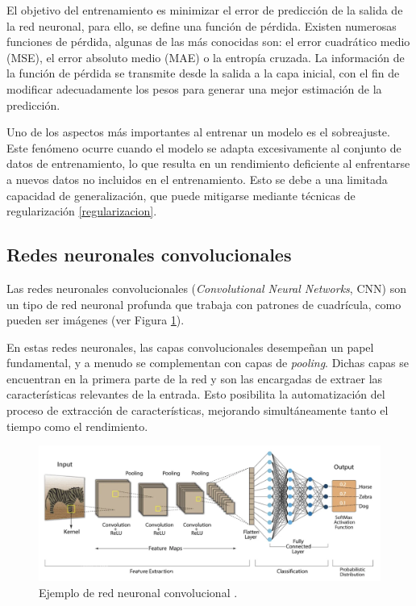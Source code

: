 El objetivo del entrenamiento es minimizar el error de predicción de la salida de la red neuronal, para ello, se define una función de pérdida. Existen numerosas funciones de pérdida, algunas de las más conocidas son: el error cuadrático medio (MSE), el error absoluto medio (MAE) o la entropía cruzada. La información de la función de pérdida se transmite desde la salida a la capa inicial, con el fin de modificar adecuadamente los pesos para generar una mejor estimación de la predicción.

Uno de los aspectos más importantes al entrenar un modelo es el sobreajuste. Este fenómeno ocurre cuando el modelo se adapta excesivamente al conjunto de datos de entrenamiento, lo que resulta en un rendimiento deficiente al enfrentarse a nuevos datos no incluidos en el entrenamiento. Esto se debe a una limitada capacidad de generalización, que puede mitigarse mediante técnicas de regularización \ref{regularizacion}.


\subsection{Redes neuronales convolucionales}
Las redes neuronales convolucionales (\textit{Convolutional Neural Networks}, CNN) \cite{35, 36, 37} son un tipo de red neuronal profunda que trabaja con patrones de cuadrícula, como pueden ser imágenes (ver Figura \ref{fig6}).

En estas redes neuronales, las capas convolucionales desempeñan un papel fundamental, y a menudo se complementan con capas de \textit{pooling}. Dichas capas se encuentran en la primera parte de la red y son las encargadas de extraer las características relevantes de la entrada. Esto posibilita la automatización del proceso de extracción de características, mejorando simultáneamente tanto el tiempo como el rendimiento.

\begin{figure}[h]
	\centering
	\includegraphics[scale=0.5]{imagenes/cap2/cnn.png}
	\caption[Ejemplo de red neuronal convolucional.]{Ejemplo de red neuronal convolucional \cite{41}.}
	\label{fig6}
\end{figure}

